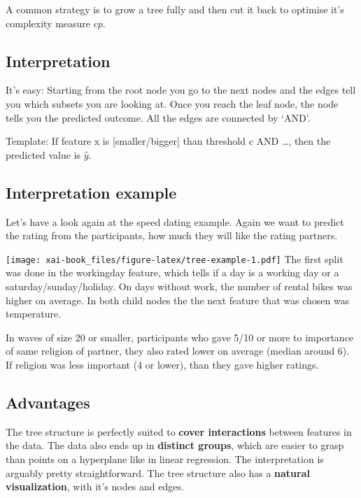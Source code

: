 \documentclass[12pt,]{krantz}
\theoremstyle{definition}
\theoremstyle{definition}
\theoremstyle{definition}
\theoremstyle{remark}
\begin{document}
A common strategy is to grow a tree fully and then cut it back to
optimise it's complexity measure \(cp\).

\subsection{Interpretation}\label{interpretation-2}

It's easy: Starting from the root node you go to the next nodes and the
edges tell you which subsets you are looking at. Once you reach the leaf
node, the node tells you the predicted outcome. All the edges are
connected by `AND'.

Template: If feature x is {[}smaller/bigger{]} than threshold c AND
\ldots{}, then the predicted value is \(\hat{y}\).

\subsection{Interpretation example}\label{interpretation-example-1}

Let's have a look again at the speed dating example. Again we want to
predict the rating from the participants, how much they will like the
rating partners.

\texttt{[image: xai-book\_files/figure-latex/tree-example-1.pdf]} The
first split was done in the workingday feature, which tells if a day is
a working day or a saturday/sunday/holiday. On days without work, the
number of rental bikes was higher on average. In both child nodes the
the next feature that was chosen was temperature.

In waves of size 20 or smaller, participants who gave 5/10 or more to
importance of same religion of partner, they also rated lower on average
(median around 6). If religion was less important (4 or lower), than
they gave higher ratings.

\subsection{Advantages}\label{advantages}

The tree structure is perfectly suited to \textbf{cover interactions}
between features in the data. The data also ends up in \textbf{distinct
groups}, which are easier to grasp than points on a hyperplane like in
linear regression. The interpretation is arguably pretty
straightforward. The tree structure also has a \textbf{natural
visualization}, with it's nodes and edges.
\end{document}
